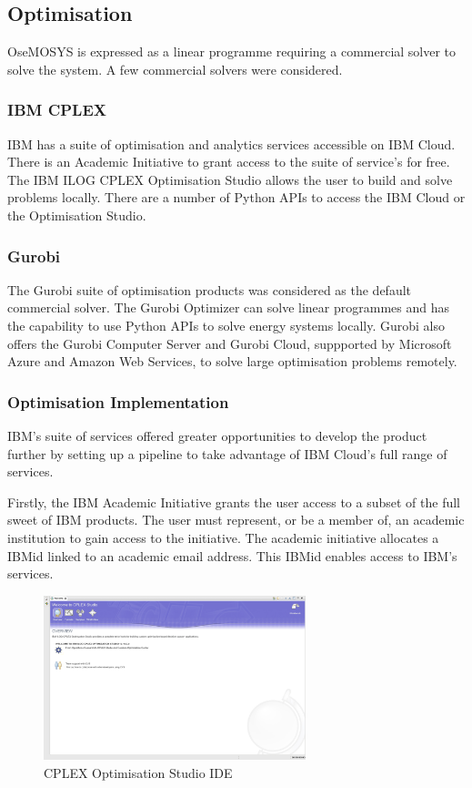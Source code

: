 \documentclass[12pt]{article}
\begin{document}
\subsection{Optimisation}
OseMOSYS is expressed as a linear programme requiring a commercial solver to solve the system.
A few commercial solvers were considered.

\subsubsection{IBM CPLEX}
IBM has a suite of optimisation and analytics services accessible on IBM Cloud.
There is an Academic Initiative to grant access to the suite of service's for free. 
The IBM ILOG CPLEX Optimisation Studio allows the user to build and solve problems locally.
There are a number of Python APIs to access the IBM Cloud or the Optimisation Studio.

\subsubsection{Gurobi}
The Gurobi suite of optimisation products was considered as the default commercial solver. 
The Gurobi Optimizer can solve linear programmes and has the capability to use Python APIs to solve energy systems locally. 
Gurobi also offers the Gurobi Computer Server and Gurobi Cloud, suppported by Microsoft Azure and Amazon Web Services, to solve large optimisation problems remotely.

\subsubsection{Optimisation Implementation}
IBM's suite of services offered greater opportunities to develop the product further
by setting up a pipeline to take advantage of IBM Cloud's full range of services.

Firstly, the IBM Academic Initiative grants the user access to a subset of the full sweet of IBM products.
The user must represent, or be a member of, an academic institution to gain access to the initiative.
The academic initiative allocates a IBMid linked to an academic email address. 
This IBMid enables access to IBM's services. 

\begin{figure}
	\begin{center}
		\includegraphics[width=0.68\textwidth]{COSIDE.png}
	\end{center}
	\caption{CPLEX Optimisation Studio IDE}
	\label{fig:COSIDE}
\end{figure}
\end{document}
